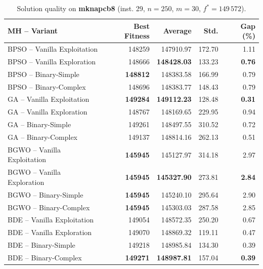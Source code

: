 \begin{table}[htbp]
  \centering
  \small
  \caption{Solution quality on \textbf{mknapcb8} (inst. 29, $n=250$, $m=30$, $f^*=149\,572$).}
  \label{tab:calidad_mknapcb8_29}
  \begin{tabular}{lrrrr}
    \toprule
    \textbf{MH -- Variant} &
    \textbf{Best Fitness} &
    \textbf{Average} &
    \textbf{Std.} &
    \textbf{Gap (\%)} \\
    \midrule
    BPSO -- Vanilla Exploitation &         148259 &        147910.97 & 172.70 &         1.11 \\
    BPSO -- Vanilla Exploration  &         148666 & \textbf{148428.03} & 133.23 & \textbf{0.76} \\
    BPSO -- Binary-Simple        & \textbf{148812} &        148383.58 & 166.99 &         0.79 \\
    BPSO -- Binary-Complex       &         148696 &        148383.77 & 148.43 &         0.79 \\
    \midrule
    GA -- Vanilla Exploitation   & \textbf{149284} & \textbf{149112.23} & 128.48 & \textbf{0.31} \\
    GA -- Vanilla Exploration    &         148767 &        148169.65 & 229.95 &         0.94 \\
    GA -- Binary-Simple          &         149261 &        148497.55 & 310.52 &         0.72 \\
    GA -- Binary-Complex         &         149137 &        148814.16 & 262.13 &         0.51 \\
    \midrule
    BGWO -- Vanilla Exploitation & \textbf{145945} &        145127.97 & 314.18 &         2.97 \\
    BGWO -- Vanilla Exploration  & \textbf{145945} & \textbf{145327.90} & 273.81 & \textbf{2.84} \\
    BGWO -- Binary-Simple        & \textbf{145945} &        145240.10 & 295.64 &         2.90 \\
    BGWO -- Binary-Complex       & \textbf{145945} &        145303.03 & 287.58 &         2.85 \\
    \midrule
    BDE -- Vanilla Exploitation  &         149054 &        148572.35 & 250.20 &         0.67 \\
    BDE -- Vanilla Exploration   &         149070 &        148869.32 & 119.11 &         0.47 \\
    BDE -- Binary-Simple         &         149218 &        148985.84 & 134.30 &         0.39 \\
    BDE -- Binary-Complex        & \textbf{149271} & \textbf{148987.81} & 157.04 & \textbf{0.39} \\
    \bottomrule
  \end{tabular}
\end{table}
